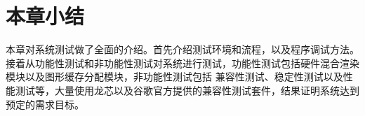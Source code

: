 
\section{本章小结}
本章对系统测试做了全面的介绍。首先介绍测试环境和流程，以及程序调试方法。接着从功能性测试和非功能性测试对系统进行测试，功能性测试包括硬件混合渲染模块以及图形缓存分配模块，非功能性测试包括
兼容性测试、稳定性测试以及性能测试等，大量使用龙芯以及谷歌官方提供的兼容性测试套件，结果证明系统达到预定的需求目标。